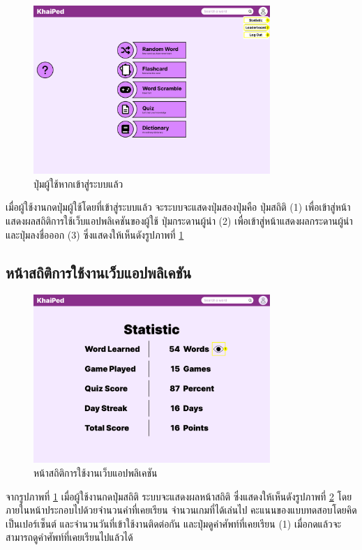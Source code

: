 \documentclass[12pt,oneside,openright,a4paper]{cpe-thai-project}
\begin{document}
\pagebreak
\begin{figure}[!h]\centering
	\includegraphics[width=0.8\textwidth, keepaspectratio=true]{image/chap3/ui/statistic/Home page - Logged In User Button.png}
	\caption{ปุ่มผู้ใช้หากเข้าสู่ระบบแล้ว}\label{fig:UI_UserButton}
\end{figure}
\hspace{1cm}
เมื่อผู้ใช้งานกดปุ่มผู้ใช้โดยที่เข้าสู่ระบบแล้ว จะระบบจะแสดงปุ่มสองปุ่มคือ ปุ่มสถิติ (1) เพื่อเข้าสู่หน้าแสดงผลสถิติการใช้เว็บแอปพลิเคชันของผู้ใช้
ปุ่มกระดานผู้นำ (2) เพื่อเข้าสู่หน้าแสดงผลกระดานผู้นำ และปุ่มลงชื่อออก (3)
ซึ่งแสดงให้เห็นดังรูปภาพที่ \ref{fig:UI_UserButton}

\pagebreak
\subsection{หน้าสถิติการใช้งานเว็บแอปพลิเคชัน}
\begin{figure}[!h]\centering
	\includegraphics[width=0.8\textwidth, keepaspectratio=true]{image/chap3/ui/statistic/Statistic.png}
	\caption{หน้าสถิติการใช้งานเว็บแอปพลิเคชัน}\label{fig:UI_Statistic}
\end{figure}
\hspace{1cm}
จากรูปภาพที่ \ref{fig:UI_UserButton} เมื่อผู้ใช้งานกดปุ่มสถิติ ระบบจะแสดงผลหน้าสถิติ ซึ่งแสดงให้เห็นดังรูปภาพที่ \ref{fig:UI_Statistic}
โดยภายในหน้าประกอบไปด้วยจำนวนคำที่เคยเรียน จำนวนเกมที่ได้เล่นไป คะแนนของแบบทดสอบโดยคิดเป็นเปอร์เซ็นต์ และจำนวนวันที่เข้าใช้งานติดต่อกัน
และปุ่มดูคำศัพท์ที่เคยเรียน (1) เมื่อกดแล้วจะสามารถดูคำศัพท์ที่เคยเรียนไปแล้วได้
\end{document}
